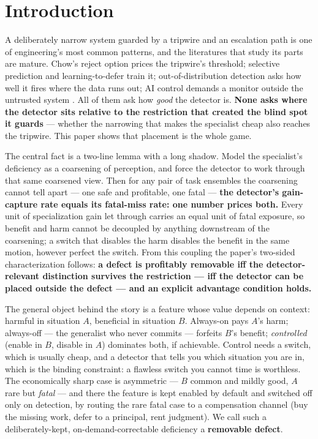 \documentclass[11pt]{article}
\theoremstyle{plain}
\theoremstyle{definition}
\begin{document}
\section{Introduction}\label{sec:intro}

A deliberately narrow system guarded by a tripwire and an escalation path is
one of engineering's most common patterns, and the literatures that study its
parts are mature. Chow's reject option prices the tripwire's threshold;
selective prediction and learning-to-defer train it; out-of-distribution
detection asks how well it fires where the data runs out; AI control demands
a monitor outside the untrusted system \citep{greenblatt2024}. All of them ask how \emph{good} the
detector is. \textbf{None asks where the detector sits relative to the restriction
that created the blind spot it guards} --- whether the narrowing that makes
the specialist cheap also reaches the tripwire. This paper shows that
placement is the whole game.

The central fact is a two-line lemma with a long shadow. Model the
specialist's deficiency as a coarsening of perception, and force the detector
to work through that same coarsened view. Then for any pair of task ensembles
the coarsening cannot tell apart --- one safe and profitable, one fatal --- \textbf{the
detector's gain-capture rate equals its fatal-miss rate: one number prices
both.} Every unit of specialization gain let through carries an equal unit
of fatal exposure, so benefit and harm cannot be decoupled by anything
downstream of the coarsening; a switch that disables the harm disables the
benefit in the same motion, however perfect the switch. From this coupling
the paper's two-sided characterization follows: \textbf{a defect is profitably
removable iff the detector-relevant distinction survives the restriction ---
iff the detector can be placed outside the defect --- and an explicit advantage
condition holds.}

The general object behind the story is a feature whose value depends on
context: harmful in situation $A$, beneficial in situation $B$. Always-on
pays $A$'s harm; always-off --- the generalist who never commits --- forfeits
$B$'s benefit; \emph{controlled} (enable in $B$, disable in $A$) dominates both,
if achievable. Control needs a switch, which is usually cheap, and a detector
that tells you which situation you are in, which is the binding constraint: a
flawless switch you cannot time is worthless. The economically sharp case is
asymmetric --- $B$ common and mildly good, $A$ rare but \emph{fatal} --- and there the
feature is kept enabled by default and switched off only on detection, by
routing the rare fatal case to a compensation channel (buy the missing work,
defer to a principal, rent judgment). We call such a deliberately-kept,
on-demand-correctable deficiency a \textbf{removable defect}.
\end{document}

